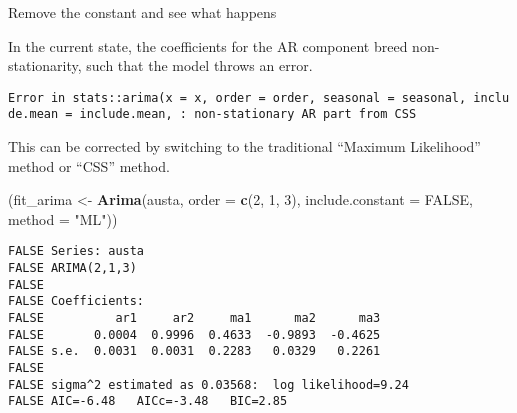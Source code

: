 \documentclass[openany]{book}
\newenvironment{Shaded}{\begin{snugshade}}{\end{snugshade}}
\newcommand{\DataTypeTok}[1]{\textcolor[rgb]{0.13,0.29,0.53}{#1}}
\newcommand{\DecValTok}[1]{\textcolor[rgb]{0.00,0.00,0.81}{#1}}
\newcommand{\KeywordTok}[1]{\textcolor[rgb]{0.13,0.29,0.53}{\textbf{#1}}}
\newcommand{\NormalTok}[1]{#1}
\newcommand{\OperatorTok}[1]{\textcolor[rgb]{0.81,0.36,0.00}{\textbf{#1}}}
\newcommand{\OtherTok}[1]{\textcolor[rgb]{0.56,0.35,0.01}{#1}}
\newcommand{\StringTok}[1]{\textcolor[rgb]{0.31,0.60,0.02}{#1}}
\renewenvironment{quote}{\begin{myquote}}{\end{myquote}}
\begin{document}
\begin{quote}
Remove the constant and see what happens
\end{quote}

\begin{Shaded}
\end{Shaded}

In the current state, the coefficients for the AR component breed non-stationarity, such that the model throws an error.

\texttt{Error\ in\ stats::arima(x\ =\ x,\ order\ =\ order,\ seasonal\ =\ seasonal,\ include.mean\ =\ include.mean,\ :\ non-stationary\ AR\ part\ from\ CSS}

This can be corrected by switching to the traditional ``Maximum Likelihood'' method or ``CSS'' method.

\begin{Shaded}
\begin{Highlighting}[]
\NormalTok{(fit_arima <-}\StringTok{ }\KeywordTok{Arima}\NormalTok{(austa, }\DataTypeTok{order =} \KeywordTok{c}\NormalTok{(}\DecValTok{2}\NormalTok{, }\DecValTok{1}\NormalTok{, }\DecValTok{3}\NormalTok{), }\DataTypeTok{include.constant =} \OtherTok{FALSE}\NormalTok{, }
  \DataTypeTok{method =} \StringTok{"ML"}\NormalTok{))}
\end{Highlighting}
\end{Shaded}

\begin{verbatim}
FALSE Series: austa 
FALSE ARIMA(2,1,3) 
FALSE 
FALSE Coefficients:
FALSE          ar1     ar2     ma1      ma2      ma3
FALSE       0.0004  0.9996  0.4633  -0.9893  -0.4625
FALSE s.e.  0.0031  0.0031  0.2283   0.0329   0.2261
FALSE 
FALSE sigma^2 estimated as 0.03568:  log likelihood=9.24
FALSE AIC=-6.48   AICc=-3.48   BIC=2.85
\end{verbatim}

\begin{Shaded}
\end{Shaded}
\end{document}
